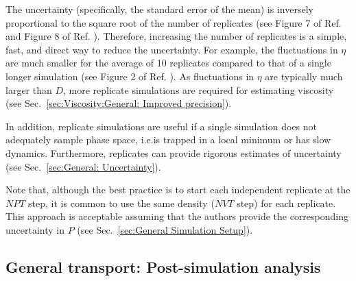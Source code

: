 \documentclass[9pt,bestpractices]{livecoms}
\providecommand{\DIFadd}[1]{{\protect\color{blue}\uwave{#1}}} %
\providecommand{\DIFaddbegin}{} %
\providecommand{\DIFaddend}{} %
\begin{document}

The uncertainty (specifically, the standard error of the mean) is inversely proportional to the square root of the number of replicates (see Figure 7 of Ref. \cite{Zhang2015} and Figure 8 of Ref. \cite{Ma2017}). Therefore, increasing the number of replicates is a simple, fast, and direct way to reduce the uncertainty. For example, the fluctuations in $\eta$ are much smaller for the average of 10 replicates compared to that of a single longer simulation (see Figure 2 of Ref. \cite{Payal2012}). As fluctuations in $\eta$ are typically much larger than $D$, more replicate simulations are required for estimating viscosity (see Sec.\ \ref{sec:Viscosity:General: Improved precision}).

In addition, replicate simulations are useful if a single simulation does not adequately sample phase space, i.e.\DIFaddbegin \DIFadd{, }\DIFaddend is trapped in a local minimum or has slow dynamics. Furthermore, replicates can provide rigorous estimates of uncertainty (see Sec.\ \ref{sec:General: Uncertainty}).

Note that, although the best practice is to start each independent replicate at the $NPT$ step, it is common to use the same density ($NVT$ step) for each replicate. This approach is acceptable assuming that the authors provide the corresponding uncertainty in $P$ (see Sec.\ \ref{sec:General Simulation Setup}).



\subsection{General transport: Post-simulation analysis} \label{sec:General: Post-simulation}
\end{document}
